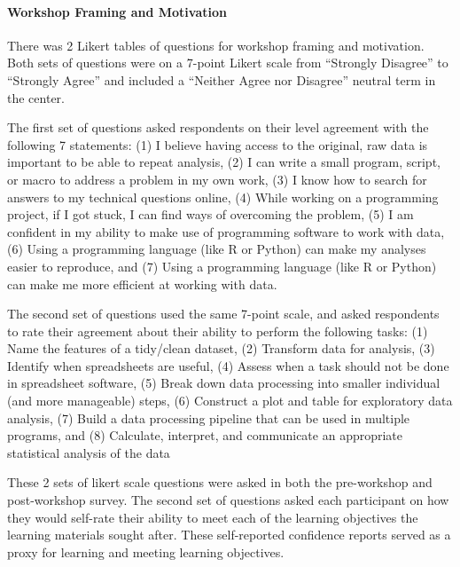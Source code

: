 \documentclass[030-workshop.tex]{subfiles}
\begin{document}
      \paragraph{Workshop Framing and Motivation}

          There was 2 Likert tables of questions for workshop framing and motivation.
          Both sets of questions were on a 7-point Likert scale from
          ``Strongly Disagree'' to ``Strongly Agree'' and
          included a ``Neither Agree nor Disagree'' neutral term in the center.

          The first set of questions asked respondents on their level agreement with the following 7 statements:
          (1) I believe having access to the original, raw data is important to be able to repeat analysis,
          (2) I can write a small program, script, or macro to address a problem in my own work,
          (3) I know how to search for answers to my technical questions online,
          (4) While working on a programming project, if I got stuck, I can find ways of overcoming the problem,
          (5) I am confident in my ability to make use of programming software to work with data,
          (6) Using a programming language (like R or Python) can make my analyses easier to reproduce, and
          (7) Using a programming language (like R or Python) can make me more efficient at working with data.

          The second set of questions used the same 7-point scale,
          and asked respondents to rate their agreement about their ability to perform the following tasks:
          (1) Name the features of a tidy/clean dataset,
          (2) Transform data for analysis,
          (3) Identify when spreadsheets are useful,
          (4) Assess when a task should not be done in spreadsheet software,
          (5) Break down data processing into smaller individual (and more manageable) steps,
          (6) Construct a plot and table for exploratory data analysis,
          (7) Build a data processing pipeline that can be used in multiple programs, and
          (8) Calculate, interpret, and communicate an appropriate statistical analysis of the data

          These 2 sets of likert scale questions were asked in both the pre-workshop and post-workshop survey.
          The second set of questions asked each participant on how they would self-rate their ability
          to meet each of the learning objectives the learning materials sought after.
          These self-reported confidence reports served as a proxy for learning and meeting learning objectives.
\end{document}
